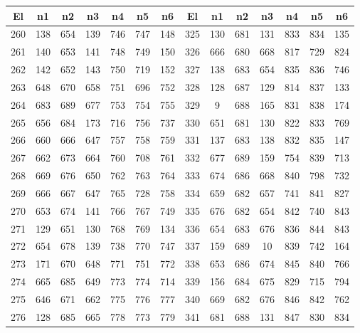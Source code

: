 \begin{apendicesenv}
\begin{table}[H]
	\centering
	\scriptsize
	\begin{tabular}{@{}ccccccc@{\hspace{1.0cm}}ccccccc@{}}
		\toprule
		 \centering El & n1 & n2 & n3 & n4 & n5 & n6 & El & n1 & n2 & n3 & n4 & n5 & n6 \\
		\midrule
		260 &  138 &  654 &  139 &  746 &  747 &  148 & 325 &  130 &  681 &  131 &  833 &  834 &  135 \\
		261 &  140 &  653 &  141 &  748 &  749 &  150 & 326 &  666 &  680 &  668 &  817 &  729 &  824 \\
		262 &  142 &  652 &  143 &  750 &  719 &  152 & 327 &  138 &  683 &  654 &  835 &  836 &  746 \\
		263 &  648 &  670 &  658 &  751 &  696 &  752 & 328 &  128 &  687 &  129 &  814 &  837 &  133 \\
		264 &  683 &  689 &  677 &  753 &  754 &  755 & 329 &    9 &  688 &  165 &  831 &  838 &  174 \\
		265 &  656 &  684 &  173 &  716 &  756 &  737 & 330 &  651 &  681 &  130 &  822 &  833 &  769 \\
		266 &  660 &  666 &  647 &  757 &  758 &  759 & 331 &  137 &  683 &  138 &  832 &  835 &  147 \\
		267 &  662 &  673 &  664 &  760 &  708 &  761 & 332 &  677 &  689 &  159 &  754 &  839 &  713 \\
		268 &  669 &  676 &  650 &  762 &  763 &  764 & 333 &  674 &  686 &  668 &  840 &  798 &  732 \\
		269 &  666 &  667 &  647 &  765 &  728 &  758 & 334 &  659 &  682 &  657 &  741 &  841 &  827 \\
		270 &  653 &  674 &  141 &  766 &  767 &  749 & 335 &  676 &  682 &  654 &  842 &  740 &  843 \\
		271 &  129 &  651 &  130 &  768 &  769 &  134 & 336 &  654 &  683 &  676 &  836 &  844 &  843 \\
		272 &  654 &  678 &  139 &  738 &  770 &  747 & 337 &  159 &  689 &   10 &  839 &  742 &  164 \\
		273 &  171 &  670 &  648 &  771 &  751 &  772 & 338 &  653 &  686 &  674 &  845 &  840 &  766 \\
		274 &  665 &  685 &  649 &  773 &  774 &  714 & 339 &  156 &  684 &  675 &  829 &  715 &  794 \\
		275 &  646 &  671 &  662 &  775 &  776 &  777 & 340 &  669 &  682 &  676 &  846 &  842 &  762 \\
		276 &  128 &  685 &  665 &  778 &  773 &  779 & 341 &  681 &  688 &  131 &  847 &  830 &  834 \\

\end{tabular}
\end{table}
\end{apendicesenv}

